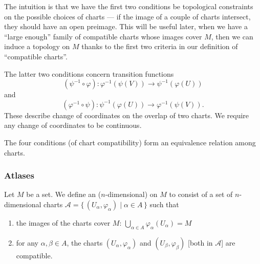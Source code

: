 \begin{remark}
The intuition is that we have the first two conditions be topological
constraints on the possible choices of charts --- if the image of a
couple of charts intersect, they should have an open preimage.
This will be useful later, when we have a ``large enough'' family of
compatible charts whose images cover $M$, then we can induce a topology
on $M$ thanks to the first two criteria in our definition of
``compatible charts''.
\end{remark}

\begin{remark}
The latter two conditions concern transition functions
\begin{equation*}
(\psi^{-1}\circ\varphi)\colon\varphi^{-1}\left(\psi(V)\right)\to\psi^{-1}\left(\varphi(U)\right)
\end{equation*}
and
\begin{equation*}
(\varphi^{-1}\circ\psi)\colon\psi^{-1}\left(\varphi(U)\right)\to\varphi^{-1}\left(\psi(V)\right).
\end{equation*}
These describe change of coordinates on the overlap of two charts.
We require any change of coordinates to be continuous.
\end{remark}

\begin{remark}
The four conditions (of chart compatibility) form an equivalence relation
among charts.
\end{remark}

\subsubsection{Atlases}

\begin{definition}
Let $M$ be a set. We define an ($n$-dimensional)  on $M$
to consist of a set of $n$-dimensional charts
$\mathcal{A}=\{\,(U_{\alpha},\varphi_{\alpha})\mid\alpha\in A\,\}$
such that
\begin{enumerate}
\item the images of the charts cover $M$: $\displaystyle\bigcup_{\alpha\in{A}}\varphi_{\alpha}(U_{\alpha})=M$
\item for any $\alpha,\beta\in A$, the charts
  $(U_{\alpha},\varphi_{\alpha})$ and $(U_{\beta},\varphi_{\beta})$
  [both in $\mathcal{A}$] are compatible.
\end{enumerate}
\end{definition}

